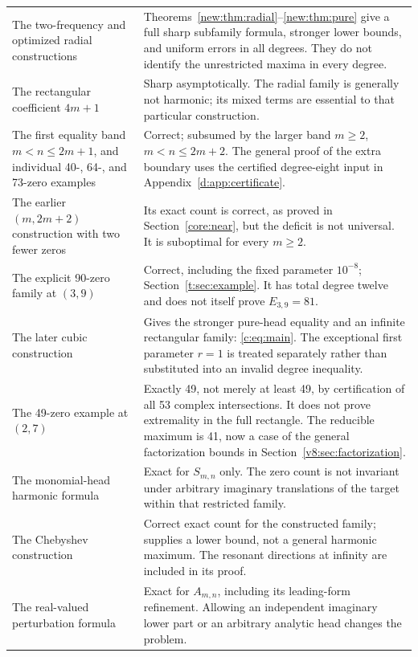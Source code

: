 \documentclass[UTF8,11pt]{ctexart}
\theoremstyle{definition}
\numberwithin{equation}{section}
\begin{document}
\begin{longtable}{@{}>{\raggedright\arraybackslash}p{}>{\raggedright\arraybackslash}p{}@{}}
The two-frequency and optimized radial constructions & Theorems~\ref{new:thm:radial}--\ref{new:thm:pure} give a full sharp subfamily formula, stronger lower bounds, and uniform errors in all degrees. They do not identify the unrestricted maxima in every degree. \\
The rectangular coefficient $4m+1$ & Sharp asymptotically. The radial family is generally not harmonic; its mixed terms are essential to that particular construction. \\
The first equality band $m<n\le2m+1$, and individual 40-, 64-, and 73-zero examples & Correct; subsumed by the larger band $m\ge2$, $m<n\le2m+2$. The general proof of the extra boundary uses the certified degree-eight input in Appendix~\ref{d:app:certificate}. \\
The earlier $(m,2m+2)$ construction with two fewer zeros & Its exact count is correct, as proved in Section~\ref{core:near}, but the deficit is not universal. It is suboptimal for every $m\ge2$. \\
The explicit 90-zero family at $(3,9)$ & Correct, including the fixed parameter $10^{-8}$; Section~\ref{t:sec:example}. It has total degree twelve and does not itself prove $E_{3,9}=81$. \\
The later cubic construction & Gives the stronger pure-head equality and an infinite rectangular family: \eqref{c:eq:main}. The exceptional first parameter $r=1$ is treated separately rather than substituted into an invalid degree inequality. \\
The 49-zero example at $(2,7)$ & Exactly 49, not merely at least 49, by certification of all 53 complex intersections. It does not prove extremality in the full rectangle. The reducible maximum is 41, now a case of the general factorization bounds
in Section~\ref{v8:sec:factorization}. \\
The monomial-head harmonic formula & Exact for $S_{m,n}$ only. The zero count is not invariant under arbitrary imaginary translations of the target within that restricted family. \\
The Chebyshev construction & Correct exact count for the constructed family; supplies a lower bound, not a general harmonic maximum. The resonant directions at infinity are included in its proof. \\
The real-valued perturbation formula & Exact for $A_{m,n}$, including its leading-form refinement. Allowing an independent imaginary lower part or an arbitrary analytic head changes the problem. \\

\end{longtable}
\end{document}
